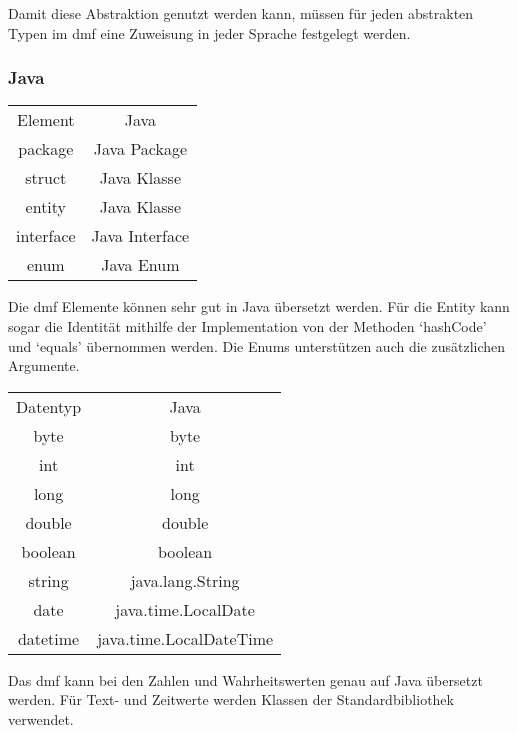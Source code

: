 \documentclass[./einleitung.tex]{subfiles}
\begin{document}
    Damit diese Abstraktion genutzt werden kann, müssen für jeden abstrakten Typen im \acrshort{dmf} eine Zuweisung in jeder Sprache festgelegt werden.

    \subsubsection{Java}
    \begin{center}
        \begin{tabular}{| c || c |}
            \hline
            Element   & Java           \\
            \hhline{|=||=|}
            package   & Java Package   \\
            \hline
            struct    & Java Klasse    \\
            \hline
            entity    & Java Klasse    \\
            \hline
            interface & Java Interface \\
            \hline
            enum      & Java Enum      \\
            \hline
        \end{tabular}
    \end{center}
    Die \acrshort{dmf} Elemente können sehr gut in Java übersetzt werden.
    Für die Entity kann sogar die Identität mithilfe der Implementation von der Methoden `hashCode' und `equals' übernommen werden.
    Die Enums unterstützen auch die zusätzlichen Argumente.

    \begin{center}
        \begin{tabular}{| c || c |}
            \hline
            Datentyp & Java                    \\
            \hhline{|=||=|}
            byte     & byte                    \\
            \hline
            int      & int                     \\
            \hline
            long     & long                    \\
            \hline
            double   & double                  \\
            \hline
            boolean  & boolean                 \\
            \hline
            string   & java.lang.String        \\
            \hline
            date     & java.time.LocalDate     \\
            \hline
            datetime & java.time.LocalDateTime \\
            \hline
        \end{tabular}
    \end{center}
    Das \acrshort{dmf} kann bei den Zahlen und Wahrheitswerten genau auf Java übersetzt werden.
    Für Text- und Zeitwerte werden Klassen der Standardbibliothek verwendet.
\end{document}
